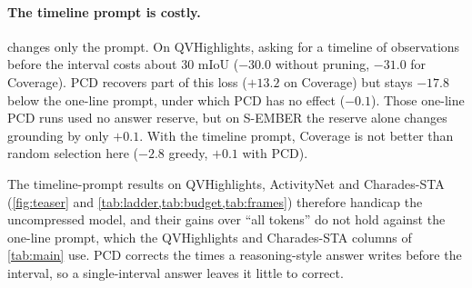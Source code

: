 \paragraph{The timeline prompt is costly.}
 changes only the prompt. On QVHighlights, asking for a timeline of observations before the
interval costs about 30 mIoU ($-30.0$ without pruning, $-31.0$ for Coverage). PCD recovers part of this loss
($+13.2$ on Coverage) but stays $-17.8$ below the one-line prompt, under which PCD has no effect ($-0.1$). Those
one-line PCD runs used no answer reserve, but on S-EMBER the reserve alone changes grounding by only $+0.1$.
 With the timeline prompt, Coverage is not better than random
selection here ($-2.8$ greedy, $+0.1$ with PCD).

The timeline-prompt results on QVHighlights, ActivityNet and Charades-STA (\cref{fig:teaser} and
\cref{tab:ladder,tab:budget,tab:frames}) therefore handicap the uncompressed model, and their gains over ``all
tokens'' do not hold against the one-line prompt, which the QVHighlights and Charades-STA columns of \cref{tab:main}
use. PCD corrects the times a reasoning-style answer writes before the interval, so a single-interval answer leaves
it little to correct.

